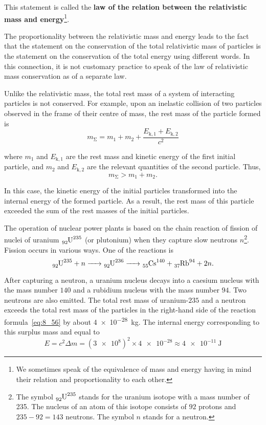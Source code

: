 \noindent
This statement is called the \textbf{law of the relation between the relativistic mass and energy}\footnote{We sometimes speak of the equivalence of mass and energy having in mind their relation and proportionality to each other.}.

The proportionality between the relativistic mass and energy leads to the fact that the statement on the conservation of the total relativistic mass of particles is the statement on the conservation of the total energy using different words. In this connection, it is not customary practice to speak of the law of relativistic mass conservation as of a separate law. 

Unlike the relativistic mass, the total rest mass of a system of interacting particles is not conserved. For example, upon an inelastic collision of two particles observed in the frame of their centre of mass, the rest mass of the particle formed is
\begin{equation*}
	m_{\upSigma} = m_1 + m_2 + \frac{E_{\text{k},1}+E_{\text{k},2}}{c^2}
\end{equation*}

\noindent
where $m_1$ and $E_{\text{k},1}$ are the rest mass and kinetic energy of the first initial particle, and $m_2$ and $E_{\text{k},2}$ are the relevant quantities of the second particle. Thus,
\begin{equation*}
	m_{\upSigma} > m_1 + m_2.
\end{equation*}

\noindent
In this case, the kinetic energy of the initial particles transformed into the internal energy of the formed particle. As a result, the rest mass of this particle exceeded the sum of the rest masses of the initial particles.

The operation of nuclear power plants is based on the chain reaction of fission of nuclei of uranium $\ce{_92U^235}$ (or plutonium) when they capture slow neutrons $n$\footnote{The symbol $\ce{_92U^235}$ stands for the uranium isotope with a mass number of 235. The nucleus of an atom of this isotope consists of $92$ protons and $235-92=143$ neutrons. The symbol $n$ stands for a neutron.}. Fission occurs in various ways. One of the reactions is
\begin{equation}\label{eq:8_56}
	\ce{_92U^235 + }n \ce{-> _92U^236 -> _55Cs^140 + _37Rb^94 + 2}n.
\end{equation}

\noindent
After capturing a neutron, a uranium nucleus decays into a caesium nucleus with the mass number $140$ and a rubidium nucleus with the mass number $94$. Two neutrons are also emitted. The total rest mass of uranium-$235$ and a neutron exceeds the total rest mass of the particles in the right-hand side of the reaction formula~\eqref{eq:8_56} by about \SI{4e-28}{\kilo\gram}. The internal energy corresponding to this surplus mass and equal to
\begin{equation*}
	E = c^2\Delta m = \left(\num{3e8}\right)^2 \times \num{4e-28} \approx \SI{4e-11}{\joule}
\end{equation*}

